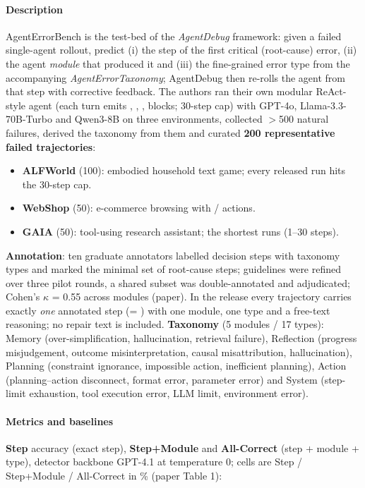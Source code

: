 \paragraph{Description} AgentErrorBench is the test-bed of the \emph{AgentDebug} framework: given a failed single-agent rollout, predict (i) the step of the first critical (root-cause) error, (ii) the agent \emph{module} that produced it and (iii) the fine-grained error type from the accompanying \emph{AgentErrorTaxonomy}; AgentDebug then re-rolls the agent from that step with corrective feedback. The authors ran their own modular ReAct-style agent (each turn emits , , ,  blocks; 30-step cap) with GPT-4o, Llama-3.3-70B-Turbo and Qwen3-8B on three environments, collected $>$500 natural failures, derived the taxonomy from them and curated \textbf{200 representative failed trajectories}:
\begin{itemize}
\item \textbf{ALFWorld} (100): embodied household text game; every released run hits the 30-step cap.
\item \textbf{WebShop} (50): e-commerce browsing with  /  actions.
\item \textbf{GAIA} (50): tool-using research assistant; the shortest runs (1--30 steps).
\end{itemize}
\textbf{Annotation}: ten graduate annotators labelled decision steps with taxonomy types and marked the minimal set of root-cause steps; guidelines were refined over three pilot rounds, a shared subset was double-annotated and adjudicated; Cohen's $\kappa$ = 0.55 across modules (paper). In the release every trajectory carries exactly \emph{one} annotated step (= ) with one module, one type and a free-text reasoning; no repair text is included. \textbf{Taxonomy} (5 modules / 17 types): Memory (over-simplification, hallucination, retrieval failure), Reflection (progress misjudgement, outcome misinterpretation, causal misattribution, hallucination), Planning (constraint ignorance, impossible action, inefficient planning), Action (planning--action disconnect, format error, parameter error) and System (step-limit exhaustion, tool execution error, LLM limit, environment error).

\paragraph{Metrics and baselines} \textbf{Step} accuracy (exact step), \textbf{Step+Module} and \textbf{All-Correct} (step + module + type), detector backbone GPT-4.1 at temperature 0; cells are Step / Step+Module / All-Correct in \% (paper Table 1):

